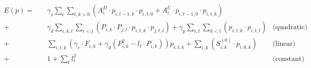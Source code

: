 \begin{align}
  E(p)
  = \quad & \gamma_s \sum_i \sum_{t, k > 0} \left(
      A_i^D \cdot p_{i, t-1, k} \cdot p_{i, t, 0}
      + A_i^U \cdot p_{i, t-1, 0} \cdot p_{i, t, k}
    \right) \\
  + \quad & \gamma_d \sum_{i, k, l} \sum_{i < j} \left(
      P_{i,k} \cdot P_{j,l} \cdot p_{i, t, k} \cdot p_{j, t, l}
    \right)
  + \gamma_p \sum_{i, t} \sum_{k < l} \left( p_{i, t, k} \cdot p_{i, t, l} \right)
  & \text{(quadratic)}
  \label{formula:qubo.result.quadratic}
  \\ + \quad &
  \sum_{i, t, k} \left(
    \gamma_c \cdot F_{i, k}
    + \gamma_d \left( P_{i, k}^2 - l_t \cdot P_{i, k} \right)
  \right) p_{i, t, k}
  + \sum_{i, k} \left( S_{i, k}^{(0)} \cdot p_{i, 0, k} \right)
  & \text{(linear)}
  \label{formula:qubo.result.linear}
  \\ + \quad &
  1 + \sum_t l_t^2
  & \text{(constant)}
  \label{formula:qubo.result.constant}
\end{align}
